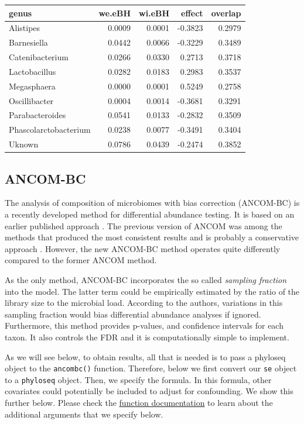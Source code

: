 \documentclass[
]{book}
\begin{document}
\begin{tabular}{l|r|r|r|r}
\hline
genus & we.eBH & wi.eBH & effect & overlap\\
\hline
Alistipes & 0.0009 & 0.0001 & -0.3823 & 0.2979\\
\hline
Barnesiella & 0.0442 & 0.0066 & -0.3229 & 0.3489\\
\hline
Catenibacterium & 0.0266 & 0.0330 & 0.2713 & 0.3718\\
\hline
Lactobacillus & 0.0282 & 0.0183 & 0.2983 & 0.3537\\
\hline
Megasphaera & 0.0000 & 0.0001 & 0.5249 & 0.2758\\
\hline
Oscillibacter & 0.0004 & 0.0014 & -0.3681 & 0.3291\\
\hline
Parabacteroides & 0.0541 & 0.0133 & -0.2832 & 0.3509\\
\hline
Phascolarctobacterium & 0.0238 & 0.0077 & -0.3491 & 0.3404\\
\hline
Uknown & 0.0786 & 0.0439 & -0.2474 & 0.3852\\
\hline
\end{tabular}

\hypertarget{ancom-bc}{%
\subsection{ANCOM-BC}\label{ancom-bc}}

The analysis of composition of microbiomes with bias correction
(ANCOM-BC) \citep{linAnalysisCompositionsMicrobiomes2020}
is a recently developed method for differential abundance testing. It is based
on an
earlier published approach \citep{mandalAnalysisCompositionMicrobiomes2015}.
The previous version of ANCOM was among the methods that produced the
most consistent results and is probably a conservative approach
\citep{nearingMicrobiomeDifferentialAbundance2021}.
However, the new ANCOM-BC method operates quite differently compared to the
former ANCOM method.

As the only method, ANCOM-BC incorporates the so called \emph{sampling fraction}
into the model. The latter term could be empirically estimated by the ratio of
the library size to the microbial load. According to the authors, variations in
this sampling fraction would bias differential abundance analyses if ignored.
Furthermore, this method provides p-values, and confidence intervals for each
taxon. It also controls the FDR and it is computationally simple to implement.

As we will see below, to obtain results, all that is needed is to pass
a phyloseq object to the \texttt{ancombc()} function. Therefore, below we first
convert our \texttt{se} object to a \texttt{phyloseq} object. Then, we specify the formula.
In this formula, other covariates could potentially be included to adjust for
confounding. We show this further below.
Please check the \href{https://rdrr.io/github/FrederickHuangLin/ANCOMBC/man/ancombc.html}{function documentation}
to learn about the additional arguments that we specify below.
\end{document}
